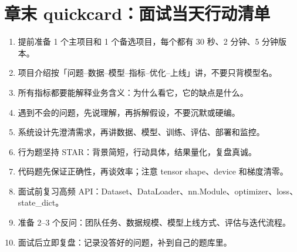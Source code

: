 \section{章末 quickcard：面试当天行动清单}
\begin{quickcard}
\begin{enumerate}[leftmargin=2em]
  \item 提前准备 1 个主项目和 1 个备选项目，每个都有 30 秒、2 分钟、5 分钟版本。
  \item 项目介绍按「问题--数据--模型--指标--优化--上线」讲，不要只背模型名。
  \item 所有指标都要能解释业务含义：为什么看它，它的缺点是什么。
  \item 遇到不会的问题，先说理解，再拆解假设，不要沉默或硬编。
  \item 系统设计先澄清需求，再讲数据、模型、训练、评估、部署和监控。
  \item 行为题坚持 STAR：背景简短，行动具体，结果量化，复盘真诚。
  \item 代码题先保证正确性，再谈效率；注意 tensor shape、device 和梯度清零。
  \item 面试前复习高频 API：Dataset、DataLoader、nn.Module、optimizer、loss、state\_dict。
  \item 准备 2--3 个反问：团队任务、数据规模、模型上线方式、评估与迭代流程。
  \item 面试后立即复盘：记录没答好的问题，补到自己的题库里。
\end{enumerate}
\end{quickcard}
